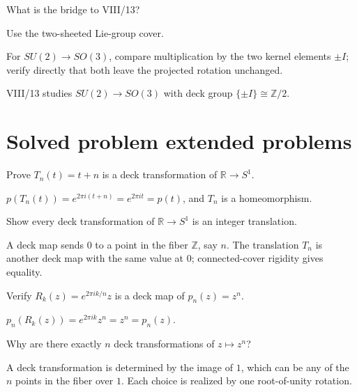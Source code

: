 \begin{exercise}\label{exr:viii12-24}
What is the bridge to VIII/13?
\end{exercise}
\begin{hint}
Use the two-sheeted Lie-group cover.

For \(SU(2)\to SO(3)\), compare multiplication by the two kernel elements \(\pm I\); verify directly that both leave the projected rotation unchanged.
\end{hint}
\begin{solution}
VIII/13 studies \(SU(2)\to SO(3)\) with deck group \(\{\pm I\}\cong\mathbb Z/2\).
\end{solution}


\section{Solved problem extended problems}

\begin{problem}\label{prob:viii12-01}
Prove \(T_n(t)=t+n\) is a deck transformation of \(\mathbb R\to S^1\).
\end{problem}
\begin{solution}
\(p(T_n(t))=e^{2\pi i(t+n)}=e^{2\pi it}=p(t)\), and \(T_n\) is a homeomorphism.
\end{solution}

\begin{problem}\label{prob:viii12-02}
Show every deck transformation of \(\mathbb R\to S^1\) is an integer translation.
\end{problem}
\begin{solution}
A deck map sends \(0\) to a point in the fiber \(\mathbb Z\), say \(n\).  The translation \(T_n\) is another deck map with the same value at \(0\); connected-cover rigidity gives equality.
\end{solution}

\begin{problem}\label{prob:viii12-03}
Verify \(R_k(z)=e^{2\pi ik/n}z\) is a deck map of \(p_n(z)=z^n\).
\end{problem}
\begin{solution}
\(p_n(R_k(z))=e^{2\pi ik}z^n=z^n=p_n(z)\).
\end{solution}

\begin{problem}\label{prob:viii12-04}
Why are there exactly \(n\) deck transformations of \(z\mapsto z^n\)?
\end{problem}
\begin{solution}
A deck transformation is determined by the image of \(1\), which can be any of the \(n\) points in the fiber over \(1\).  Each choice is realized by one root-of-unity rotation.
\end{solution}

